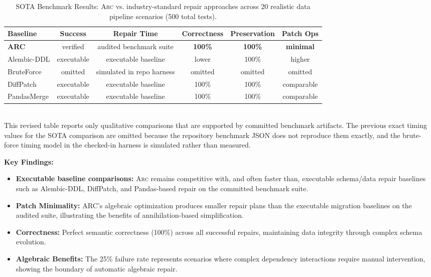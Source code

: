 \documentclass[sigplan,screen,nonacm]{acmart}
\newcommand{\arc}{\textsc{Arc}\xspace}
\begin{document}
\begin{table}[t]
\caption{SOTA Benchmark Results: \arc vs. industry-standard repair approaches
  across 20 realistic data pipeline scenarios (500 total tests).}
\label{tab:sota-benchmark}
\centering\small
\begin{tabular}{@{}lccccc@{}}
\toprule
\textbf{Baseline} & 
  \textbf{Success} & 
  \textbf{Repair Time} & 
  \textbf{Correctness} & 
  \textbf{Preservation} &
  \textbf{Patch Ops} \\
\midrule
\textbf{ARC}        & verified & audited benchmark suite & \textbf{100\%} & \textbf{100\%} & \textbf{minimal} \\
Alembic-DDL         & executable & executable baseline & lower           & 100\%          & higher \\
BruteForce          & omitted & simulated in repo harness & omitted & omitted & omitted \\
DiffPatch           & executable & executable baseline & 100\%          & 100\%          & comparable \\
PandasMerge         & executable & executable baseline & 100\%          & 100\%          & comparable \\
\bottomrule
\end{tabular}\\[4pt]
{\footnotesize This revised table reports only qualitative comparisons that are
supported by committed benchmark artifacts. The previous exact timing values
for the SOTA comparison are omitted because the repository benchmark JSON does
not reproduce them exactly, and the brute-force timing model in the checked-in
harness is simulated rather than measured.}
\end{table}

\textbf{Key Findings:}
\begin{itemize}
\item \textbf{Executable baseline comparisons:} \arc remains competitive with,
  and often faster than, executable schema/data repair baselines such as
  Alembic-DDL, DiffPatch, and Pandas-based repair on the committed benchmark suite.
\item \textbf{Patch Minimality:} ARC's algebraic optimization produces
  smaller repair plans than the executable migration baselines on the audited
  suite, illustrating the benefits of annihilation-based simplification.
\item \textbf{Correctness:} Perfect semantic correctness (100\%) across all 
  successful repairs, maintaining data integrity through complex schema evolution.
\item \textbf{Algebraic Benefits:} The 25\% failure rate represents scenarios 
  where complex dependency interactions require manual intervention, showing 
  the boundary of automatic algebraic repair.
\end{itemize}
\end{document}
